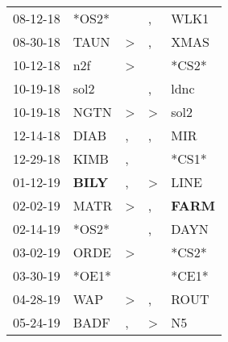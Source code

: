 \begin{supertabular}{p{0.07\textwidth}p{0.06\textwidth}p{0.02\textwidth}p{0.02\textwidth}p{0.06\textwidth}}
          08-12-18\textsuperscript{} &                            *OS2* &                  &                , &           WLK1\textsuperscript{} \\
          08-30-18\textsuperscript{} &           TAUN\textsuperscript{} &     \textgreater &                , &           XMAS\textsuperscript{} \\
          10-12-18\textsuperscript{} &            n2f\textsuperscript{} &     \textgreater &                  &                            *CS2* \\
          10-19-18\textsuperscript{} &           sol2\textsuperscript{} &                  &                , &           ldnc\textsuperscript{} \\
          10-19-18\textsuperscript{} &           NGTN\textsuperscript{} &     \textgreater &     \textgreater &           sol2\textsuperscript{} \\
          12-14-18\textsuperscript{} &           DIAB\textsuperscript{} &                , &                , &            MIR\textsuperscript{} \\
          12-29-18\textsuperscript{} &           KIMB\textsuperscript{} &                , &                  &                            *CS1* \\
          01-12-19\textsuperscript{} &  \textbf{BILY\textsuperscript{}} &                , &     \textgreater &           LINE\textsuperscript{} \\
          02-02-19\textsuperscript{} &           MATR\textsuperscript{} &     \textgreater &                , &  \textbf{FARM\textsuperscript{}} \\
          02-14-19\textsuperscript{} &                            *OS2* &                  &                , &           DAYN\textsuperscript{} \\
          03-02-19\textsuperscript{} &           ORDE\textsuperscript{} &     \textgreater &                  &                            *CS2* \\
          03-30-19\textsuperscript{} &                            *OE1* &                  &                  &                            *CE1* \\
          04-28-19\textsuperscript{} &            WAP\textsuperscript{} &     \textgreater &                , &           ROUT\textsuperscript{} \\
          05-24-19\textsuperscript{} &           BADF\textsuperscript{} &                , &     \textgreater &             N5\textsuperscript{} \\

\end{supertabular}
